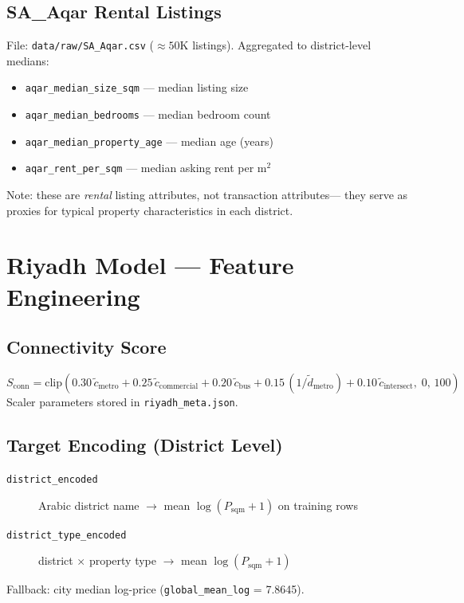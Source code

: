 \documentclass[11pt, a4paper, twoside]{report}
\begin{document}
\section{SA\_Aqar Rental Listings}
File: \texttt{data/raw/SA\_Aqar.csv} ($\approx 50$K listings). Aggregated to
district-level medians:
\begin{itemize}
  \item \texttt{aqar\_median\_size\_sqm} --- median listing size
  \item \texttt{aqar\_median\_bedrooms} --- median bedroom count
  \item \texttt{aqar\_median\_property\_age} --- median age (years)
  \item \texttt{aqar\_rent\_per\_sqm} --- median asking rent per m$^2$
\end{itemize}
Note: these are \emph{rental} listing attributes, not transaction attributes---
they serve as proxies for typical property characteristics in each district.

\chapter{Riyadh Model --- Feature Engineering}
\label{ch:riyadh_features}

\section{Connectivity Score}
\begin{equation}
  S_\text{conn} = \text{clip}\!\left(
    0.30\,\tilde{c}_\text{metro} +
    0.25\,\tilde{c}_\text{commercial} +
    0.20\,\tilde{c}_\text{bus} +
    0.15\,(1/\tilde{d}_\text{metro}) +
    0.10\,\tilde{c}_\text{intersect},\;
    0,\,100
  \right)
\end{equation}
Scaler parameters stored in \texttt{riyadh\_meta.json}.

\section{Target Encoding (District Level)}
\begin{description}
  \item[\texttt{district\_encoded}] Arabic district name $\to$ mean
        $\log(P_{\text{sqm}}+1)$ on training rows
  \item[\texttt{district\_type\_encoded}] district $\times$ property type
        $\to$ mean $\log(P_{\text{sqm}}+1)$
\end{description}
Fallback: city median log-price (\texttt{global\_mean\_log} = 7.8645).
\end{document}
